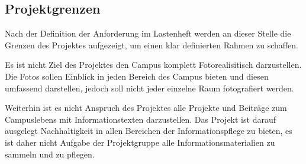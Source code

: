 \subsection{Projektgrenzen}
\label{sec:Projektgrenzen}

Nach der Definition der Anforderung im Lastenheft werden an dieser Stelle die Grenzen des Projektes aufgezeigt, um einen klar definierten Rahmen zu schaffen.

Es ist nicht Ziel des Projektes den Campus komplett Fotorealisitisch darzustellen. Die Fotos sollen Einblick in jeden Bereich des Campus bieten und diesen umfassend darstellen, jedoch soll nicht jeder einzelne Raum fotografiert werden.

Weiterhin ist es nicht Anspruch des Projektes alle Projekte und Beiträge zum Campuslebens mit Informationstexten darzustellen. Das Projekt ist darauf ausgelegt Nachhaltigkeit in allen Bereichen der Informationspflege zu bieten, es ist daher nicht Aufgabe der Projektgruppe alle Informationsmaterialien zu sammeln und zu pflegen.

